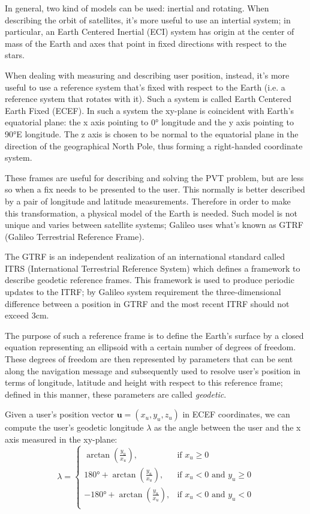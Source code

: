 \par

In general, two kind of models can be used: inertial and rotating. When
describing the orbit of satellites, it's more useful to use an intertial system;
in particular, an Earth Centered Inertial (ECI) system has origin at the center
of mass of the Earth and axes that point in fixed directions with respect to the
stars.

When dealing with measuring and describing user position, instead, it's more
useful to use a reference system that's fixed with respect to the Earth (i.e. a
reference system that rotates with it). Such a system is called Earth Centered
Earth Fixed (ECEF). In such a system the xy-plane is coincident with Earth's
equatorial plane: the x axis pointing to 0° longitude and the y axis pointing to
90°E longitude. The z axis is chosen to be normal to the equatorial plane in the
direction of the geographical North Pole, thus forming a right-handed coordinate
system.

These frames are useful for describing and solving the PVT problem, but are less
so when a fix needs to be presented to the user. This normally is better
described by a pair of longitude and latitude measurements. Therefore in order
to make this transformation, a physical model of the Earth is needed. Such model
is not unique and varies between satellite systems; Galileo uses what's known as
GTRF (Galileo Terrestrial Reference Frame).

The GTRF is an independent realization of an international standard called ITRS
(International Terrestrial Reference System) which defines a framework to
describe geodetic reference frames. This framework is used to produce periodic
updates to the ITRF; by Galileo system requirement the three-dimensional
difference between a position in GTRF and the most recent ITRF should not exceed
3cm.

The purpose of such a reference frame is to define the Earth's surface by a
closed equation representing an ellipsoid with a certain number of degrees of
freedom. These degrees of freedom are then represented by parameters that can be
sent along the navigation message and subsequently used to resolve user's
position in terms of longitude, latitude and height with respect to this
reference frame; defined in this manner, these parameters are called
\textit{geodetic}.

Given a user's position vector $\bm{u} = (x_u, y_u, z_u)$ in ECEF coordinates,
we can compute the user's geodetic longitude $\lambda$ as the angle between the
user and the x axis measured in the xy-plane:
\begin{equation}
  \lambda = \begin{cases}
    \arctan \left(\frac{y_u}{x_u}\right),& \text{if } x_u \geq 0 \\
    180°+\arctan \left(\frac{y_u}{x_u}\right),& \text{if } x_u < 0 \text{ and } y_u \geq 0\\
    -180°+\arctan \left(\frac{y_u}{x_u}\right),& \text{if } x_u < 0 \text{ and } y_u < 0\\
  \end{cases}
\end{equation}

